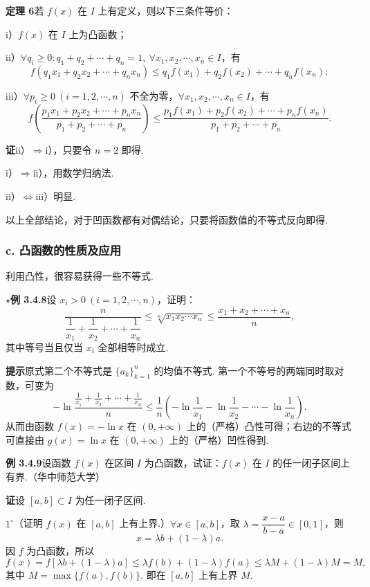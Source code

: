 \documentclass[UTF8,12pt,a4paper,fontset=fandol]{ctexart}
\begin{document}
\noindent\textbf{定理 6}\quad 若 $f(x)$ 在 $I$ 上有定义，则以下三条件等价：

i）$f(x)$ 在 $I$ 上为凸函数；

ii）$\forall q_i\ge0:q_1+q_2+\cdots+q_n=1,\ \forall x_1,x_2,\cdots,x_n\in I$，有
\[
  f(q_1x_1+q_2x_2+\cdots+q_nx_n)
  \le q_1f(x_1)+q_2f(x_2)+\cdots+q_nf(x_n);
\]

iii）$\forall p_i\ge0\ (i=1,2,\cdots,n)$ 不全为零，$\forall x_1,x_2,\cdots,x_n\in I$，有
\[
  f\left(\frac{p_1x_1+p_2x_2+\cdots+p_nx_n}{p_1+p_2+\cdots+p_n}\right)
  \le \frac{p_1f(x_1)+p_2f(x_2)+\cdots+p_nf(x_n)}
  {p_1+p_2+\cdots+p_n}.
\]

\noindent\textbf{证}\quad ii）$\Rightarrow$i），只要令 $n=2$ 即得.

i）$\Rightarrow$ii），用数学归纳法.

ii）$\Leftrightarrow$iii）明显.

以上全部结论，对于凹函数都有对偶结论，只要将函数值的不等式反向即得.

\subsubsection*{c. 凸函数的性质及应用}

利用凸性，很容易获得一些不等式.

\noindent\textbf{$\star$例 3.4.8}\quad 设 $x_i>0\ (i=1,2,\cdots,n)$，证明：
\[
  \frac{n}{\dfrac1{x_1}+\dfrac1{x_2}+\cdots+\dfrac1{x_n}}
  \le \sqrt[n]{x_1x_2\cdots x_n}
  \le \frac{x_1+x_2+\cdots+x_n}{n},
\]
其中等号当且仅当 $x_i$ 全部相等时成立.

\noindent\textbf{提示}\quad 原式第二个不等式是 $\{a_k\}_{k=1}^n$ 的均值不等式. 第一个不等号的两端同时取对数，可变为
\[
  -\ln\frac{\frac1{x_1}+\frac1{x_2}+\cdots+\frac1{x_n}}n
  \le \frac1n\left(-\ln\frac1{x_1}-\ln\frac1{x_2}-\cdots-\ln\frac1{x_n}\right).
\]
从而由函数 $f(x)=-\ln x$ 在 $(0,+\infty)$ 上的（严格）凸性可得；右边的不等式可直接由 $g(x)=\ln x$ 在 $(0,+\infty)$ 上的（严格）凹性得到.

\noindent\textbf{例 3.4.9}\quad 设函数 $f(x)$ 在区间 $I$ 为凸函数，试证：$f(x)$ 在 $I$ 的任一闭子区间上有界.（华中师范大学）

\noindent\textbf{证}\quad 设 $[a,b]\subset I$ 为任一闭子区间.

$1^\circ$（证明 $f(x)$ 在 $[a,b]$ 上有上界.）$\forall x\in[a,b]$，取 $\lambda=\dfrac{x-a}{b-a}\in[0,1]$，则
\[
  x=\lambda b+(1-\lambda)a.
\]
因 $f$ 为凸函数，所以
\[
  f(x)=f[\lambda b+(1-\lambda)a]\le \lambda f(b)+(1-\lambda)f(a)\le \lambda M+(1-\lambda)M=M,
\]
其中 $M=\max\{f(a),f(b)\}$. 即在 $[a,b]$ 上有上界 $M$.
\end{document}
